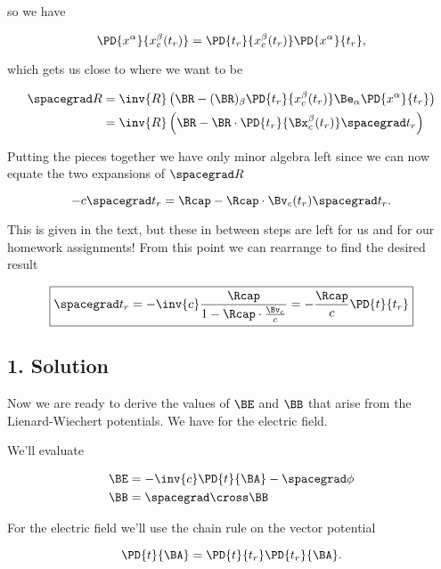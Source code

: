 so we have

\begin{equation}\label{eqn:relElectroDynProblemSet5:340}
\PD{x^\alpha}{x_c^\beta(t_r)} = \PD{t_r}{x_c^\beta(t_r)} \PD{x^\alpha}{t_r},
\end{equation}

which gets us close to where we want to be

\begin{align*}
\spacegrad R
&=
\inv{R} \left(\BR - (\BR)_\beta \PD{t_r}{x_c^\beta(t_r)} \Be_\alpha \PD{x^\alpha}{t_r} \right) \\
&=
\inv{R} \left(\BR - \BR \cdot \PD{t_r}{\Bx_c^\beta(t_r)} \spacegrad t_r \right)
\end{align*}

Putting the pieces together we have only minor algebra left since we can now equate the two expansions of $\spacegrad R$

\begin{equation}\label{eqn:relElectroDynProblemSet5:360}
- c \spacegrad t_r = \Rcap - \Rcap \cdot \Bv_c(t_r) \spacegrad t_r.
\end{equation}

This is given in the text, but these in between steps are left for us and for our homework assignments!  From this point we can rearrange to find the desired result

\begin{equation}\label{eqn:relElectroDynProblemSet5:380}
\boxed{
\spacegrad t_r = -\inv{c} \frac{\Rcap }{ 1 - \Rcap \cdot \frac{\Bv_c}{c} } = - \frac{\Rcap}{c} \PD{t}{t_r}
}
\end{equation}

\subsection{1. Solution}

Now we are ready to derive the values of $\BE$ and $\BB$ that arise from the Lienard-Wiechert potentials.  We have for the electric field.

We'll evaluate 

\begin{align*}
\BE &= -\inv{c} \PD{t}{\BA} - \spacegrad \phi \\
\BB &= \spacegrad \cross \BB
\end{align*}

For the electric field we'll use the chain rule on the vector potential

\begin{equation}\label{eqn:relElectroDynProblemSet5:400}
\PD{t}{\BA} = \PD{t}{t_r} \PD{t_r}{\BA}.
\end{equation}

